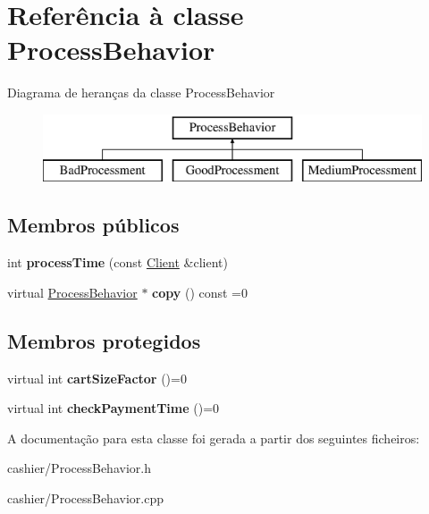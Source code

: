 \hypertarget{classProcessBehavior}{\section{Referência à classe Process\-Behavior}
\label{d7/d45/classProcessBehavior}
}
Diagrama de heranças da classe Process\-Behavior\begin{figure}[H]
\begin{center}
\leavevmode
\includegraphics[height=2.000000cm]{d7/d45/classProcessBehavior}
\end{center}
\end{figure}
\subsection*{Membros públicos}
\begin{DoxyCompactItemize}
\item 
\hypertarget{classProcessBehavior_a17faac1683e9da239d33026db1fd11f8}{int {\bfseries process\-Time} (const \hyperlink{classClient}{Client} \&client)}\label{d7/d45/classProcessBehavior_a17faac1683e9da239d33026db1fd11f8}

\item 
\hypertarget{classProcessBehavior_afec2ad87efbdc778a93c7e692c97878e}{virtual \hyperlink{classProcessBehavior}{Process\-Behavior} $\ast$ {\bfseries copy} () const =0}\label{d7/d45/classProcessBehavior_afec2ad87efbdc778a93c7e692c97878e}

\end{DoxyCompactItemize}
\subsection*{Membros protegidos}
\begin{DoxyCompactItemize}
\item 
\hypertarget{classProcessBehavior_a7ccbf0f5499819a6f6c524bfd8595921}{virtual int {\bfseries cart\-Size\-Factor} ()=0}\label{d7/d45/classProcessBehavior_a7ccbf0f5499819a6f6c524bfd8595921}

\item 
\hypertarget{classProcessBehavior_ac3e63322c133f11387759d34dd8fb13c}{virtual int {\bfseries check\-Payment\-Time} ()=0}\label{d7/d45/classProcessBehavior_ac3e63322c133f11387759d34dd8fb13c}

\end{DoxyCompactItemize}


A documentação para esta classe foi gerada a partir dos seguintes ficheiros\-:\begin{DoxyCompactItemize}
\item 
cashier/Process\-Behavior.\-h\item 
cashier/Process\-Behavior.\-cpp\end{DoxyCompactItemize}
